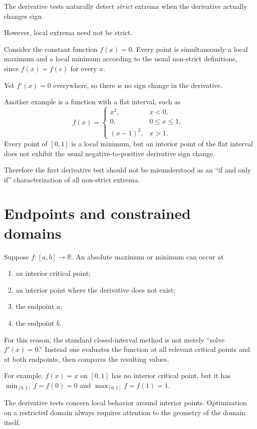 \documentclass{essay}
\begin{document}
The derivative tests naturally detect \emph{strict} extrema when the derivative actually changes sign.

However, local extrema need not be strict.

Consider the constant function \(f(x)=0\).
Every point is simultaneously a local maximum and a local minimum according to the usual non-strict definitions, since
\(f(x)=f(c)\) for every \(x\).

Yet \(f'(x)=0\) everywhere, so there is no sign change in the derivative.

Another example is a function with a flat interval, such as
\[
  f(x)=
  \begin{cases}
    x^{2}, & x<0,\\
    0, & 0\leq x\leq1,\\
    (x-1)^{2}, & x>1.
  \end{cases}
\]
Every point of \([0,1]\) is a local minimum, but an interior point of the flat interval does not exhibit the usual negative-to-positive derivative sign change.

Therefore the first derivative test should not be misunderstood as an ``if and only if'' characterization of all non-strict extrema.

\section{Endpoints and constrained domains}

Suppose \(f:[a,b]\to\mathbb{R}\).
An absolute maximum or minimum can occur at

\begin{enumerate}
  \item an interior critical point;
  \item an interior point where the derivative does not exist;
  \item the endpoint \(a\);
  \item the endpoint \(b\).
\end{enumerate}

For this reason, the standard closed-interval method is not merely ``solve \(f'(x)=0\).'' Instead one evaluates the function at all relevant critical points and at both endpoints, then compares the resulting values.

For example, \(f(x)=x\) on \([0,1]\) has no interior critical point, but it has \(\min_{[0,1]}f=f(0)=0\) and \(\max_{[0,1]}f=f(1)=1\).

The derivative tests concern local behavior around interior points. Optimization on a restricted domain always requires attention to the geometry of the domain itself.
\end{document}
